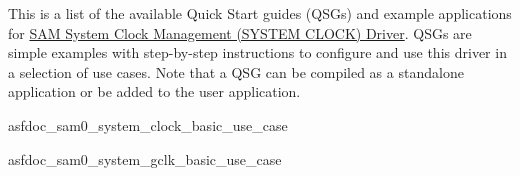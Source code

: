 This is a list of the available Quick Start guides (Q\+S\+Gs) and example applications for \hyperlink{group__asfdoc__sam0__system__clock__group}{S\+A\+M System Clock Management (S\+Y\+S\+T\+E\+M C\+L\+O\+C\+K) Driver}. Q\+S\+Gs are simple examples with step-\/by-\/step instructions to configure and use this driver in a selection of use cases. Note that a Q\+S\+G can be compiled as a standalone application or be added to the user application.


\begin{DoxyItemize}
\item asfdoc\+\_\+sam0\+\_\+system\+\_\+clock\+\_\+basic\+\_\+use\+\_\+case
\item asfdoc\+\_\+sam0\+\_\+system\+\_\+gclk\+\_\+basic\+\_\+use\+\_\+case 
\end{DoxyItemize}